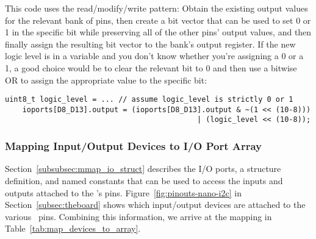This code uses the read/modify/write pattern:
Obtain the existing output values for the relevant bank of pins, then create a bit vector that can be used to set 0 or 1 in the specific bit while preserving all of the other pins' output values, and then finally assign the resulting bit vector to the bank's output register.
If the new logic level is in a variable and you don't know whether you're assigning a 0 or a 1, a good choice would be to clear the relevant bit to 0 and then use a bitwise OR to assign the appropriate value to the specific bit:
\begin{lstlisting}[firstnumber=3]
    uint8_t logic_level = ... // assume logic_level is strictly 0 or 1
    ioports[D8_D13].output = (ioports[D8_D13].output & ~(1 << (10-8)))
                                            | (logic_level << (10-8));
\end{lstlisting}


\subsubsection{Mapping Input/Output Devices to I/O Port Array}


Section~\ref{subsubsec:mmap_io_struct} describes the I/O ports, a structure definition, and named constants that can be used to access the inputs and outputs attached to the \mcuboard's pins.
Figure~\ref{fig:pinouts-nano-i2c} in Section~\ref{subsec:theboard} shows which input/output devices are attached to the various \mcuboard\ pins.
Combining this information, we arrive at the mapping in Table~\ref{tab:map_devices_to_array}.

